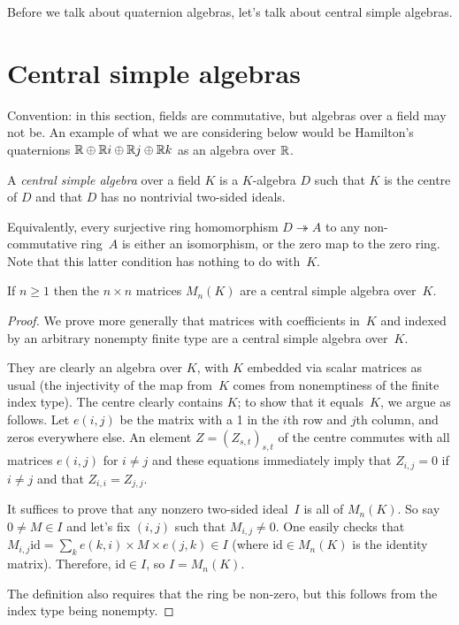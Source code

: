 Before we talk about quaternion algebras, let's talk about central simple algebras.

\section{Central simple algebras}

Convention: in this section, fields are commutative, but algebras over a field may not be. An example
of what we are considering below would be Hamilton's quaternions $\mathbb{R}\oplus\mathbb{R} i\oplus\mathbb{R} j\oplus\mathbb{R} k$ as an algebra over $\mathbb{R}$.


\begin{definition}
    \label{IsCentralSimple}
    \leanok
A \emph{central simple algebra} over a field $K$ is a $K$-algebra $D$ such that $K$ is the centre of $D$
and that $D$ has no nontrivial two-sided ideals.
\end{definition}

Equivalently, every surjective ring homomorphism $D\twoheadrightarrow A$ to any non-commutative ring~$A$
is either an isomorphism, or the zero map to the zero ring. Note that this latter condition has nothing
to do with~$K$.

\begin{lemma}
    \label{MatrixRing.isCentralSimple}
    \leanok
    If $n\geq1$ then the $n\times n$ matrices $M_n(K)$ are a central simple algebra over~$K$.
\end{lemma}
\begin{proof}
We prove more generally that matrices with coefficients in~$K$ and indexed by an arbitrary nonempty
finite type are a central simple algebra over~$K$.

They are clearly an algebra over $K$, with $K$ embedded via scalar matrices as usual
(the injectivity of the map from~$K$ comes from nonemptiness of the finite index type).
The centre clearly contains $K$; to show that it
equals~$K$, we argue as follows. Let $e(i,j)$ be the matrix with a 1 in the $i$th row and $j$th
column, and zeros everywhere else. An element $Z=(Z_{s,t})_{s,t}$ of the centre commutes with
all matrices $e(i,j)$ for $i\not=j$ and these equations immediately imply that $Z_{i,j}=0$ if $i\not=j$
and that $Z_{i,i}=Z_{j,j}$.

It suffices to prove that any nonzero two-sided ideal~$I$ is all of $M_n(K)$. So say $0\not=M\in I$
and let's fix $(i,j)$ such that $M_{i,j}\not=0$. One easily checks that
$M_{i,j} \mathrm{id} = \sum_{k}e(k,i)\times M\times e(j,k)\in I$ (where $\mathrm{id} \in M_n(K)$
is the identity matrix). Therefore, $\mathrm{id} \in I$, so $I = M_n(K)$.

The definition also requires that the ring be non-zero, but this follows from the index type being nonempty.
\end{proof}

